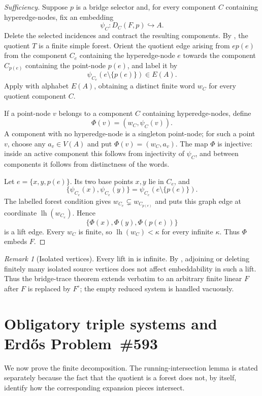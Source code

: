 \documentclass[11pt]{amsart}
\theoremstyle{definition}
\theoremstyle{remark}
\newtheorem{remark}[remark]{Remark}
\numberwithin{equation}{section}
\newcommand{\lh}{\operatorname{lh}}
\begin{document}
\begin{proof}[Sufficiency]
Suppose $p$ is a bridge selector and, for every component $C$ containing
hyperedge-nodes, fix an embedding
\[
 \psi_C:D_C(F,p)\hookrightarrow A.
\]
Delete the selected incidences and contract the resulting components.
By , the quotient $T$ is a finite simple forest.
Orient the quotient edge arising from $ep(e)$ from the component $C_e$
containing the hyperedge-node $e$ towards the component $C_{p(e)}$
containing the point-node $p(e)$, and label it by
\[
 \psi_{C_e}(e\setminus\{p(e)\})\in E(A).
\]
Apply  with alphabet $E(A)$, obtaining a
distinct finite word $w_C$ for every quotient component $C$.

If a point-node $v$ belongs to a component $C$ containing
hyperedge-nodes, define
\[
 \Phi(v)=(w_C,\psi_C(v)).
\]
A component with no hyperedge-node is a singleton point-node; for such a
point $v$, choose any $a_v\in V(A)$ and put
$\Phi(v)=(w_C,a_v)$.  The map $\Phi$ is injective: inside an active
component this follows from injectivity of $\psi_C$, and between
components it follows from distinctness of the words.

Let $e=\{x,y,p(e)\}$.  Its two base points $x,y$ lie in $C_e$, and
\[
 \{\psi_{C_e}(x),\psi_{C_e}(y)\}
   =\psi_{C_e}(e\setminus\{p(e)\}).
\]
The labelled forest condition gives
$w_{C_e}\subsetneq w_{C_{p(e)}}$ and puts this graph edge at coordinate
$\lh(w_{C_e})$.  Hence
\[
 \{\Phi(x),\Phi(y),\Phi(p(e))\}
\]
is a lift edge.  Every $w_C$ is finite, so $\lh(w_C)<\kappa$ for every
infinite $\kappa$.  Thus $\Phi$ embeds $F$.
\end{proof}

\begin{remark}[Isolated vertices]
\label{rem:bridge-trace-isolated}
Every lift in  is infinite.  By
, adjoining or deleting finitely many isolated
source vertices does not affect embeddability in such a lift.  Thus the
bridge-trace theorem extends verbatim to an arbitrary finite linear $F$
after $F$ is replaced by $F^\circ$; the empty reduced system is handled
vacuously.
\end{remark}


\section{Obligatory triple systems and Erd\H{o}s Problem~\#593}
\label{sec:classification}

We now prove the finite decomposition.  The running-intersection lemma is
stated separately because the fact that the quotient is a forest does
not, by itself, identify how the corresponding expansion pieces
intersect.
\end{document}

